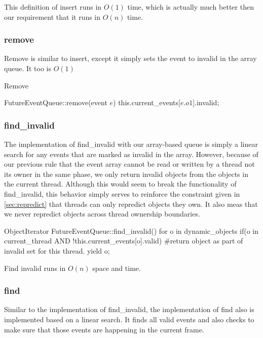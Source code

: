 \documentclass[conference]{IEEEtran}
\begin{document}
This definition of insert runs in $O(1)$ time, which is actually much better then our requirement that it runs in $O(n)$ time.

\subsubsection{remove}

Remove is similar to insert, except it simply sets the event to invalid in the array queue.  It too is $O(1)$

\begin{algorithm}
\caption{Remove}
\begin{algorithmic}
\STATE FutureEventQueue::remove(event $e$)
\STATE this.current\_events[$e.o1$].invalid;
\end{algorithmic}
\end{algorithm}

\subsubsection{find\_invalid}

The implementation of find\_invalid with our array-based queue is simply a linear search for any events that are marked as invalid in the array.
However, because of our previous rule that the event array cannot be read or written by a thread not its owner in the same phase, we only return invalid
objects from the objects in the current thread.  Although this would seem to break the functionality of find\_invalid, this behavior simply serves to reinforce
the constraint given in \ref{sec:repredict} that threads can only repredict objects they own. It also meas that we never repredict objects across thread
ownership boundaries.

\begin{verbatimtab}[3]
ObjectIterator FutureEventQueue::find_invalid()
{
   for o in dynamic_objects
   {
      if(o in current_thread AND !this.current_events[o].valid)
      {
      #return object as part of invalid set for this thread.
	yield o;
      }
   }
}
\end{verbatimtab}

Find invalid runs in $O(n)$ space and time.

\subsubsection{find}

Similar to the implementation of find\_invalid, the implementation of find also is implemented based on a linear search.  It finds all valid events
and also checks to make sure that those events are happening in the current frame.
\end{document}
